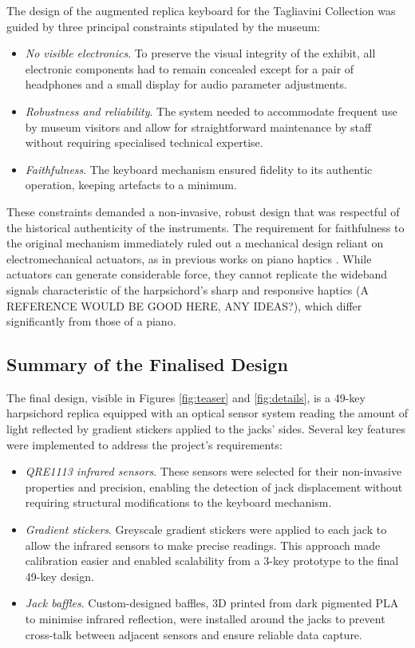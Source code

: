 The design of the augmented replica keyboard for the Tagliavini Collection was guided by three principal constraints stipulated by the museum:
\begin{itemize}
\item \emph{No visible electronics}. To preserve the visual integrity of the exhibit, all electronic components had to remain concealed except for a pair of headphones and a small display for audio parameter adjustments.
\item \emph{Robustness and reliability}. The system needed to accommodate frequent use by museum visitors and allow for straightforward maintenance by staff without requiring specialised technical expertise.
\item \emph{Faithfulness}. The keyboard mechanism ensured fidelity to its authentic operation, keeping artefacts to a minimum. 
\end{itemize}
These constraints demanded a non-invasive, robust design that was respectful of the historical authenticity of the instruments. The requirement for faithfulness to the original mechanism immediately ruled out a mechanical design reliant on electromechanical actuators, as in previous works on piano haptics \cite{Timmermans2020,Gillespie1996}. While actuators can generate considerable force, they cannot replicate the wideband signals characteristic of the harpsichord's sharp and responsive haptics (A REFERENCE WOULD BE GOOD HERE, ANY IDEAS?), which differ significantly from those of a piano.



\subsection{Summary of the Finalised Design}

The final design, visible in Figures \ref{fig:teaser} and \ref{fig:details}, is a 49-key harpsichord replica equipped with an optical sensor system reading the amount of light reflected by gradient stickers applied to the jacks' sides. Several key features were implemented to address the project’s requirements:

\begin{itemize}
\item \emph{QRE1113 infrared sensors}. These sensors were selected for their non-invasive properties and precision, enabling the detection of jack displacement without requiring structural modifications to the keyboard mechanism.
\item \emph{Gradient stickers}. Greyscale gradient stickers were applied to each jack to allow the infrared sensors to make precise readings. This approach made calibration easier and enabled scalability from a 3-key prototype to the final 49-key design.
\item \emph{Jack baffles}. Custom-designed baffles, 3D printed from dark pigmented PLA to minimise infrared reflection, were installed around the jacks to prevent cross-talk between adjacent sensors and ensure reliable data capture.
\end{itemize}

